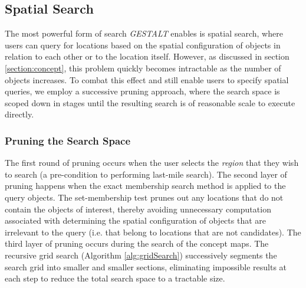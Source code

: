 



        


\subsection{Spatial Search}

The most powerful form of search \emph{GESTALT} enables is spatial search, where users can query for locations based on the spatial configuration of objects in relation to each other or to the location itself.
However, as discussed in section \ref{section:concept}, this problem quickly becomes intractable as the number of objects increases.
To combat this effect and still enable users to specify spatial queries, we employ a successive pruning approach, where the search space is scoped down in stages until the resulting search is of reasonable scale to execute directly.

\subsubsection{Pruning the Search Space}
The first round of pruning occurs when the user selects the \emph{region} that they wish to search (a pre-condition to performing last-mile search). 
The second layer of pruning happens when the exact membership search method is applied to the query objects.
The set-membership test prunes out any locations that do not contain the objects of interest, thereby avoiding unnecessary computation associated with determining the spatial configuration of objects that are irrelevant to the query (i.e. that belong to locations that are not candidates).
The third layer of pruning occurs during the search of the concept maps. 
The recursive grid search (Algorithm \ref{alg:gridSearch}) successively segments the search grid into smaller and smaller sections, eliminating impossible results at each step to reduce the total search space to a tractable size.

